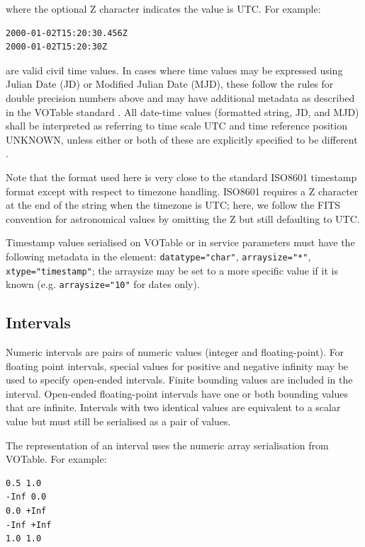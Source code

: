 \documentclass[11pt,letter]{ivoa}
\begin{document}
\noindent
where the optional Z character indicates the value is UTC. For example:

\begin{verbatim}
2000-01-02T15:20:30.456Z
2000-01-02T15:20:30Z
\end{verbatim}

\noindent
are valid civil time values. In cases where time values may be
expressed using Julian Date (JD) or Modified Julian Date (MJD), these follow the
rules for double precision numbers above and may have additional metadata as
described in the VOTable standard \citep{2019ivoa.spec.1021O}. All date-time values (formatted string, JD,
and MJD) shall be interpreted as referring to time scale UTC and time reference
position UNKNOWN, unless either or both of these are explicitly specified to be
different \citep{2007ivoa.spec.1030R}.

Note that the format used here is very close to the standard ISO8601 timestamp
format except with respect to timezone handling. ISO8601 requires a Z character
at the end of the string when the timezone is UTC; here, we follow the FITS
\citep{std:FITS} convention for astronomical values by omitting the Z but still
defaulting to UTC.

Timestamp values serialised on VOTable or in service parameters must have the following metadata in
the  element: \verb|datatype="char"|,  \verb|arraysize="*"|,
\verb|xtype="timestamp"|; the arraysize may be set to a more specific value if it is known (e.g.
\verb|arraysize="10"| for dates only).

\subsection{Intervals}
Numeric intervals are pairs of numeric values (integer and floating-point). For floating point
intervals, special values for positive and negative infinity may be used to specify open-ended intervals.
Finite bounding values are included in the interval. Open-ended floating-point
intervals have one or both bounding values that are infinite. Intervals with two identical values
are equivalent to a scalar value but must still be serialised as a pair of values.

The representation of an interval uses the numeric array serialisation from
VOTable. For example:

\begin{verbatim}
0.5 1.0
-Inf 0.0
0.0 +Inf
-Inf +Inf
1.0 1.0
\end{verbatim}
\end{document}
